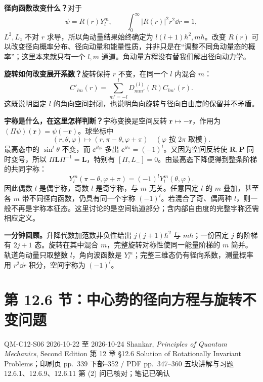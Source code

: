 \textbf{径向函数改变什么？}对于
\begin{equation}
  \psi=R(r)Y_l^m,\qquad \int_0^\infty|R(r)|^2r^2\dd r=1,
\end{equation}
$L^2,L_z$ 不对 $r$ 求导，所以角动量结果始终确定为 $l(l+1)\hbar^2,m\hbar$。改变 $R(r)$ 可以改变径向概率分布、径向动量和能量性质，并非只是在“调整不同角动量态的概率”；这里本来就只有一个 $l,m$ 通道。角动量方程没有替我们解出径向动力学。

\textbf{旋转如何改变展开系数？}旋转保持 $r$ 不变，在同一个 $l$ 内混合 $m$：
\begin{equation}
  C'_{lm}(r)=\sum_{m'=-l}^lD^{(l)}_{mm'}(R)C_{lm'}(r).
\end{equation}
这既说明固定 $l$ 的角向空间封闭，也说明角向旋转与径向自由度的保留并不矛盾。

\textbf{宇称是什么，在这里怎样判断？}宇称变换是空间反转 $\mathbf r\mapsto-\mathbf r$，作用为 $(\Pi\psi)(\mathbf r)=\psi(-\mathbf r)$。球坐标中
\begin{equation}
  (r,\theta,\varphi)\longmapsto(r,\pi-\theta,\varphi+\pi)
  \quad(\varphi\text{ 按 }2\pi\text{ 取模}).
\end{equation}
最高态中的 $\sin^l\theta$ 不变，而 $\ee^{\ii l\varphi}$ 多出 $\ee^{\ii l\pi}=(-1)^l$。又因为空间反转使 $\mathbf R,\mathbf P$ 同时变号，所以 $\Pi\mathbf L\Pi^{-1}=\mathbf L$，特别有 $[\Pi,L_-]=0$。由最高态下降便得到整条阶梯的共同宇称：
\begin{equation}
  \boxed{Y_l^m(\pi-\theta,\varphi+\pi)=(-1)^lY_l^m(\theta,\varphi).}
\end{equation}
因此偶数 $l$ 是偶宇称，奇数 $l$ 是奇宇称，与 $m$ 无关。任意固定 $l$ 的 $m$ 叠加，甚至各 $m$ 带不同径向函数，仍具有同一个宇称 $(-1)^l$。若混合了奇、偶两种 $l$，则一般不再是宇称本征态。这里讨论的是空间轨道部分；含内部自由度的完整宇称还需相应定义。

\textbf{一分钟回顾。}升降代数加范数非负性给出 $j(j+1)\hbar^2$ 与 $m\hbar$；一份固定 $j$ 的阶梯有 $2j+1$ 态。旋转在其中混合 $m$，完整旋转对称性使同一能量阶梯的 $m$ 简并。轨道角动量只取整数 $l$，角向波函数是 $Y_l^m$；完整三维态仍有径向系数，测量概率用 $r^2\dd r$ 积分，空间宇称为 $(-1)^l$。

\section{第 12.6 节：中心势的径向方程与旋转不变问题}
\label{section:QM-C12-S06}
\studymeta
  {QM-C12-S06}
  {2026-10-22 至 2026-10-24}
  {Shankar, \textit{Principles of Quantum Mechanics}, Second Edition}
  {第 12 章 \S 12.6 Solution of Rotationally Invariant Problems；印刷页 pp.~339 下部--352 / PDF pp.~347--360}
  {五块讲解与习题 12.6.1、12.6.9、12.6.11 第 (2) 问已核对；笔记已确认}

